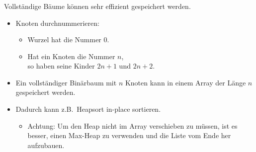 \begin{frame}
\frametitle{\insertsection}
\begin{block}
{Vollständige Bäume können sehr effizient gespeichert werden.}
\begin{itemize}
	\item Knoten durchnummerieren:
	\begin{itemize}
		\item Wurzel hat die Nummer $0$.
		\item Hat ein Knoten die Nummer $n$, \\
			  so haben seine Kinder $2n+1$ und $2n+2$.
	\end{itemize}
	\item<2-> Ein vollständiger Binärbaum mit $n$ Knoten kann in einem Array der Länge $n$ gespeichert werden.
	\item<3-> Dadurch kann z.B.\ Heapsort \alert{in-place} sortieren.
	\begin{itemize}
		\item \alert{Achtung:} Um den Heap nicht im Array verschieben zu müssen, ist es besser, einen Max-Heap zu verwenden
		und die Liste vom Ende her aufzubauen.
	\end{itemize}
\end{itemize}
\end{block}
\end{frame}

\endinput

\begin{frame}
\frametitle{\insertsection}
\begin{block}
{}
\end{block}
\end{frame}
